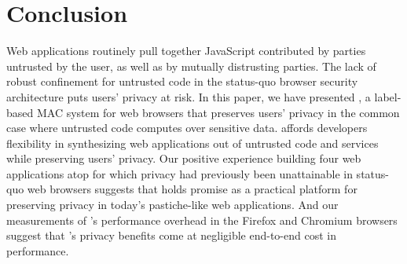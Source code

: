 \section{Conclusion}
\label{sec:conclusion}

Web applications routinely pull together JavaScript contributed by
parties untrusted by the user, as well as by mutually distrusting
parties.
The lack of robust confinement  for untrusted code in the status-quo
browser security architecture puts users' privacy at risk.
In this paper, we have presented
\sys{}, a label-based MAC system for web browsers that preserves
users' privacy in the common case where untrusted code computes over
sensitive data. \sys{} affords developers flexibility in synthesizing
web applications out of untrusted code and services while preserving
users' privacy. Our positive experience building four web applications
atop \sys{} for which privacy had previously been unattainable in
status-quo web browsers suggests that \sys{} holds promise as a
practical platform for preserving privacy in today's pastiche-like web
applications. And our measurements of \sys{}'s performance overhead in
the Firefox and Chromium browsers suggest that \sys{}'s privacy
benefits come at negligible end-to-end cost in performance.

